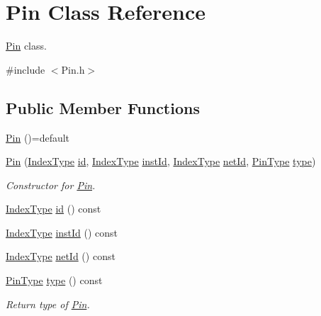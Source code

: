 \hypertarget{classPin}{}\section{Pin Class Reference}
\label{classPin}


\hyperlink{classPin}{Pin} class.  




{\ttfamily \#include $<$Pin.\+h$>$}

\subsection*{Public Member Functions}
\begin{DoxyCompactItemize}
\item 
\hyperlink{classPin_a6fbd67b1c9ed59f0af668f675bbc561f}{Pin} ()=default
\item 
\hyperlink{classPin_aa8987e1d2ee361faa8929c98953a03f2}{Pin} (\hyperlink{type_8h_a581e8093e28e7362f2b6937296190676}{Index\+Type} \hyperlink{classPin_a36da1568fe78213394b67a5a470ffb00}{id}, \hyperlink{type_8h_a581e8093e28e7362f2b6937296190676}{Index\+Type} \hyperlink{classPin_a8ddc3b130a28cbc1781b155dea8c333e}{inst\+Id}, \hyperlink{type_8h_a581e8093e28e7362f2b6937296190676}{Index\+Type} \hyperlink{classPin_a5bcc2c816d52b915690738820c4042b3}{net\+Id}, \hyperlink{type_8h_afaab50027002ecbb6c8ac27e727d1bb4}{Pin\+Type} \hyperlink{classPin_a788397e41a9a4fa196b36f8076eb6d6c}{type})
\begin{DoxyCompactList}\small\item\em Constructor for \hyperlink{classPin}{Pin}. \end{DoxyCompactList}\item 
\hyperlink{type_8h_a581e8093e28e7362f2b6937296190676}{Index\+Type} \hyperlink{classPin_a36da1568fe78213394b67a5a470ffb00}{id} () const
\item 
\hyperlink{type_8h_a581e8093e28e7362f2b6937296190676}{Index\+Type} \hyperlink{classPin_a8ddc3b130a28cbc1781b155dea8c333e}{inst\+Id} () const
\item 
\hyperlink{type_8h_a581e8093e28e7362f2b6937296190676}{Index\+Type} \hyperlink{classPin_a5bcc2c816d52b915690738820c4042b3}{net\+Id} () const
\item 
\hyperlink{type_8h_afaab50027002ecbb6c8ac27e727d1bb4}{Pin\+Type} \hyperlink{classPin_a788397e41a9a4fa196b36f8076eb6d6c}{type} () const
\begin{DoxyCompactList}\small\item\em Return type of \hyperlink{classPin}{Pin}. \end{DoxyCompactList}\end{DoxyCompactItemize}
